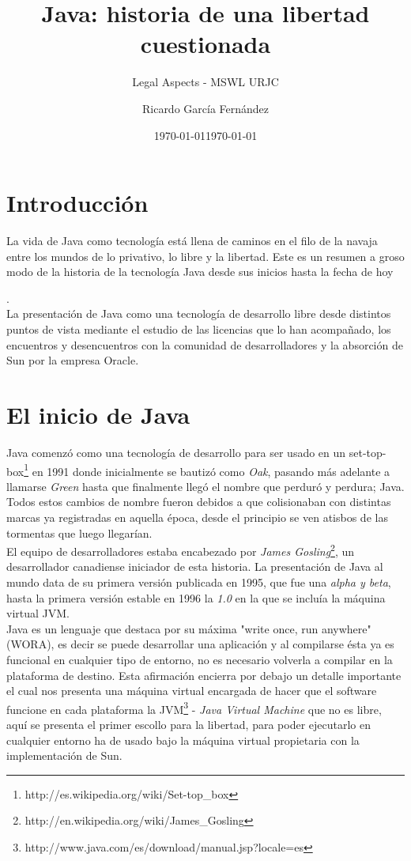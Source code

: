 \documentclass[11pt]{scrartcl}
\title{\textbf{Java: historia de una libertad cuestionada}}
\subtitle{Legal Aspects - MSWL URJC}
\author{Ricardo García Fernández}
\date{\today}
\begin{document}
\maketitle

\tableofcontents


\section{Introducción}

La vida de Java como tecnología está llena de caminos en el filo de la navaja entre los mundos de lo privativo, lo libre y la libertad. Este es un resumen a groso modo de la historia de la tecnología Java desde sus inicios hasta la fecha de hoy \date{\today}.\\
La presentación de Java como una tecnología de desarrollo libre desde distintos puntos de vista mediante el estudio de las licencias que lo han acompañado, los encuentros y desencuentros con la comunidad de desarrolladores y la absorción de Sun por la empresa Oracle.

\section{El inicio de Java}

Java comenzó como una tecnología de desarrollo para ser usado en un set-top-box\footnote{http://es.wikipedia.org/wiki/Set-top\_box} en 1991 donde inicialmente se bautizó como \emph{Oak}, pasando más adelante a llamarse \emph{Green} hasta que finalmente llegó el nombre que perduró y perdura; Java.
Todos estos cambios de nombre fueron debidos a que colisionaban con distintas marcas ya registradas en aquella época, desde el principio se ven atisbos de las tormentas que luego llegarían.\\
El equipo de desarrolladores estaba encabezado por \emph{James Gosling}\footnote{http://en.wikipedia.org/wiki/James\_Gosling}, un desarrollador canadiense iniciador de esta historia. La presentación de Java al mundo data de su primera versión publicada en 1995, que fue una \emph{alpha y beta}, hasta la primera versión estable en 1996 la \emph{1.0} en la que se incluía la máquina virtual JVM.\\
Java es un lenguaje que destaca por su máxima "write once, run anywhere" (WORA), es decir se puede desarrollar una aplicación y al compilarse ésta ya es funcional en cualquier tipo de entorno, no es necesario volverla a compilar en la plataforma de destino. Esta afirmación encierra por debajo un detalle importante el cual nos presenta una máquina virtual encargada de hacer que el software funcione en cada plataforma la JVM\footnote{http://www.java.com/es/download/manual.jsp?locale=es} - \emph{Java Virtual Machine} que no es libre, aquí se presenta el primer escollo para la libertad, para poder ejecutarlo en cualquier entorno ha de usado bajo la máquina virtual propietaria con la implementación de Sun.
\end{document}
